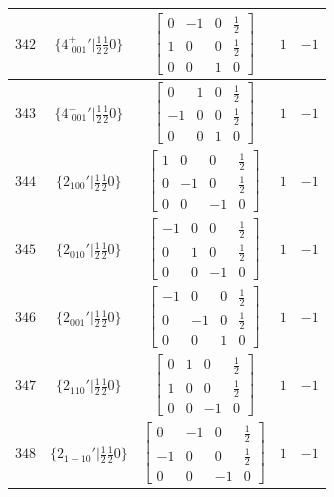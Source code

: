 \documentclass[fleqn,8pt]{jsarticle}
\begin{document}
\begin{longtable}{ccccc}
$ 342 $ & $ \{4^{+}_{\,\,001}{}'|\frac{1}{2} \frac{1}{2} 0\} $ & $ \begin{bmatrix} 0 & -1 & 0 & \frac{1}{2} \\ 1 & 0 & 0 & \frac{1}{2} \\ 0 & 0 & 1 & 0 \end{bmatrix} $ & $ 1 $ & $ -1 $ \\ \hline
$ 343 $ & $ \{4^{-}_{\,\,001}{}'|\frac{1}{2} \frac{1}{2} 0\} $ & $ \begin{bmatrix} 0 & 1 & 0 & \frac{1}{2} \\ -1 & 0 & 0 & \frac{1}{2} \\ 0 & 0 & 1 & 0 \end{bmatrix} $ & $ 1 $ & $ -1 $ \\ \hline
$ 344 $ & $ \{2{}_{100}{}'|\frac{1}{2} \frac{1}{2} 0\} $ & $ \begin{bmatrix} 1 & 0 & 0 & \frac{1}{2} \\ 0 & -1 & 0 & \frac{1}{2} \\ 0 & 0 & -1 & 0 \end{bmatrix} $ & $ 1 $ & $ -1 $ \\ \hline
$ 345 $ & $ \{2{}_{010}{}'|\frac{1}{2} \frac{1}{2} 0\} $ & $ \begin{bmatrix} -1 & 0 & 0 & \frac{1}{2} \\ 0 & 1 & 0 & \frac{1}{2} \\ 0 & 0 & -1 & 0 \end{bmatrix} $ & $ 1 $ & $ -1 $ \\ \hline
$ 346 $ & $ \{2{}_{001}{}'|\frac{1}{2} \frac{1}{2} 0\} $ & $ \begin{bmatrix} -1 & 0 & 0 & \frac{1}{2} \\ 0 & -1 & 0 & \frac{1}{2} \\ 0 & 0 & 1 & 0 \end{bmatrix} $ & $ 1 $ & $ -1 $ \\ \hline
$ 347 $ & $ \{2{}_{110}{}'|\frac{1}{2} \frac{1}{2} 0\} $ & $ \begin{bmatrix} 0 & 1 & 0 & \frac{1}{2} \\ 1 & 0 & 0 & \frac{1}{2} \\ 0 & 0 & -1 & 0 \end{bmatrix} $ & $ 1 $ & $ -1 $ \\ \hline
$ 348 $ & $ \{2{}_{1-10}{}'|\frac{1}{2} \frac{1}{2} 0\} $ & $ \begin{bmatrix} 0 & -1 & 0 & \frac{1}{2} \\ -1 & 0 & 0 & \frac{1}{2} \\ 0 & 0 & -1 & 0 \end{bmatrix} $ & $ 1 $ & $ -1 $ \\ \hline

\end{longtable}
\end{document}
